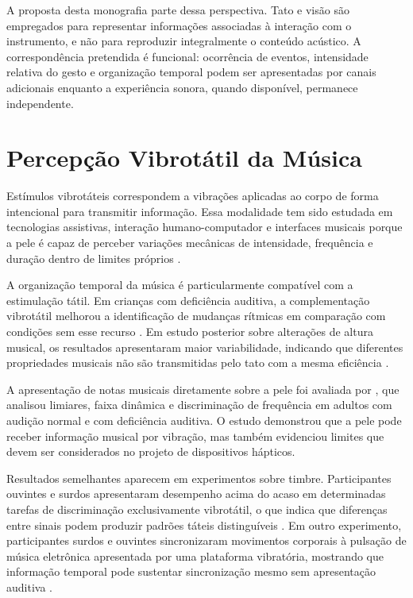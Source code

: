 A proposta desta monografia parte dessa perspectiva. Tato e visão são empregados para representar informações associadas à interação com o instrumento, e não para reproduzir integralmente o conteúdo acústico. A correspondência pretendida é funcional: ocorrência de eventos, intensidade relativa do gesto e organização temporal podem ser apresentadas por canais adicionais enquanto a experiência sonora, quando disponível, permanece independente.

\section{Percepção Vibrotátil da Música}

Estímulos vibrotáteis correspondem a vibrações aplicadas ao corpo de forma intencional para transmitir informação. Essa modalidade tem sido estudada em tecnologias assistivas, interação humano-computador e interfaces musicais porque a pele é capaz de perceber variações mecânicas de intensidade, frequência e duração dentro de limites próprios \cite{paisa2023}.

A organização temporal da música é particularmente compatível com a estimulação tátil. Em crianças com deficiência auditiva, a complementação vibrotátil melhorou a identificação de mudanças rítmicas em comparação com condições sem esse recurso \cite{darrowgoll1989}. Em estudo posterior sobre alterações de altura musical, os resultados apresentaram maior variabilidade, indicando que diferentes propriedades musicais não são transmitidas pelo tato com a mesma eficiência \cite{darrow1992}.

A apresentação de notas musicais diretamente sobre a pele foi avaliada por \textcite{hopkins2016}, que analisou limiares, faixa dinâmica e discriminação de frequência em adultos com audição normal e com deficiência auditiva. O estudo demonstrou que a pele pode receber informação musical por vibração, mas também evidenciou limites que devem ser considerados no projeto de dispositivos hápticos.

Resultados semelhantes aparecem em experimentos sobre timbre. Participantes ouvintes e surdos apresentaram desempenho acima do acaso em determinadas tarefas de discriminação exclusivamente vibrotátil, o que indica que diferenças entre sinais podem produzir padrões táteis distinguíveis \cite{russo2012}. Em outro experimento, participantes surdos e ouvintes sincronizaram movimentos corporais à pulsação de música eletrônica apresentada por uma plataforma vibratória, mostrando que informação temporal pode sustentar sincronização mesmo sem apresentação auditiva \cite{tranchant2017}.

